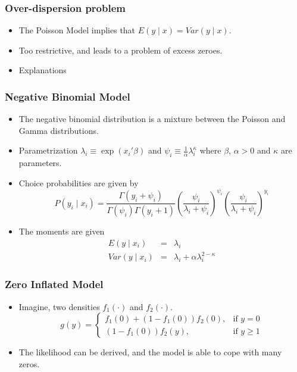 \documentclass{beamer}
\newcommand{\1}{\mathbb{1}}
\begin{document}
\begin{frame}\frametitle{Over-dispersion problem}
\begin{itemize}
\item The Poisson Model implies that $E(y \mid x) = Var(y \mid x)$. 
\item Too restrictive, and leads to a problem of excess zeroes. 
\item Explanations
\end{itemize}
\end{frame}

\begin{frame}\frametitle{Negative Binomial Model}
\begin{itemize}
\item The negative binomial distribution is a mixture between the Poisson and Gamma distributions. 
\item Parametrization $\lambda_i \equiv \exp(x_i' \beta)$ and $\psi_i \equiv \tfrac{1}{\alpha} \lambda_i^{\kappa}$ where $\beta$, $\alpha > 0$ and $\kappa$ are parameters. 
\item Choice probabilities are given by
\begin{equation}
P(y_i \mid x_i) = \dfrac{\Gamma(y_i + \psi_i)}{\Gamma(\psi_i)\Gamma(y_i+1)} \left( \dfrac{\psi_i}{\lambda_i + \psi_i} \right)^{\psi_i} \left( \dfrac{\psi_i}{\lambda_i + \psi_i} \right)^{y_i}
\end{equation}
\item The moments are given
\begin{eqnarray*}
E(y \mid x_i) &=& \lambda_i\\
Var(y \mid x_i) &=& \lambda_i + \alpha \lambda_i^{2-\kappa}
\end{eqnarray*}
\end{itemize}
\end{frame}

\begin{frame}\frametitle{Zero Inflated Model}
\begin{itemize}
\item Imagine, two densities $f_1(\cdot)$ and $f_2(\cdot)$. 
\begin{equation}
g(y) = \begin{cases} f_1(0) + (1-f_1(0)) f_2(0), & \mbox{if } y = 0 \\ 
(1-f_1(0)) f_2(y), & \mbox{if } y \geq 1 \end{cases}
\end{equation}
\item The likelihood can be derived, and the model is able to cope with many zeros. 
\end{itemize}
\end{frame}
\end{document}
